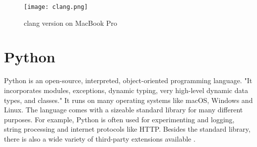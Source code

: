 \begin{figure}[htbp]
	\centering
	\texttt{[image: clang.png]}
	\caption{clang version on MacBook Pro}
	\label{figure:clang}
\end{figure}

\section{Python}
Python is an open-source, interpreted, object-oriented programming language. "It incorporates modules, exceptions, dynamic typing, very high-level dynamic data types, and classes." It runs on many operating systems like macOS, Windows and Linux.
The language comes with a sizeable standard library for many different purposes. For example, Python is often used for experimenting and logging, string processing and internet protocols like HTTP. Besides the standard library, there is also a wide variety of third-party extensions available \cite{python}.
